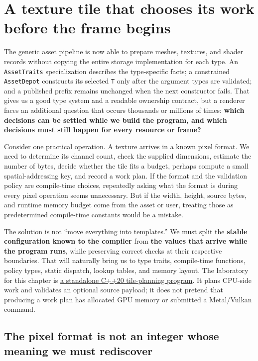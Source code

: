 \section{A texture tile that chooses its work before the frame begins}\label{05-engine-i-ch005-a-texture-tile-that-chooses-its-work-before-the-frame-begins}

The generic asset pipeline is now able to prepare meshes, textures, and shader records without copying the entire storage implementation for each type. An \texttt{AssetTraits} specialization describes the type-specific facts; a constrained \texttt{AssetDepot} constructs its selected \texttt{T} only after the argument types are validated; and a published prefix remains unchanged when the next constructor fails. That gives us a good type system and a readable ownership contract, but a renderer faces an additional question that occurs thousands or millions of times: \textbf{which decisions can be settled while we build the program, and which decisions must still happen for every resource or frame?}

Consider one practical operation. A texture arrives in a known pixel format. We need to determine its channel count, check the supplied dimensions, estimate the number of bytes, decide whether the tile fits a budget, perhaps compute a small spatial-addressing key, and record a work plan. If the format and the validation policy are compile-time choices, repeatedly asking what the format is during every pixel operation seems unnecessary. But if the width, height, source bytes, and runtime memory budget come from the asset or user, treating those as predetermined compile-time constants would be a mistake.

The solution is not ``move everything into templates.'' We must split the \textbf{stable configuration known to the compiler} from \textbf{the values that arrive while the program runs}, while preserving correct checks at their respective boundaries. That will naturally bring us to type traits, compile-time functions, policy types, static dispatch, lookup tables, and memory layout. The laboratory for this chapter is \hyperref[source-file-f5eb017280bb6b2ae6b1475d]{a standalone C++20 tile-planning program}. It plans CPU-side work and validates an optional source payload; it does not pretend that producing a work plan has allocated GPU memory or submitted a Metal/Vulkan command.

\subsection{The pixel format is not an integer whose meaning we must rediscover}\label{05-engine-i-ch005-the-pixel-format-is-not-an-integer-whose-meaning-we-must-rediscover}

